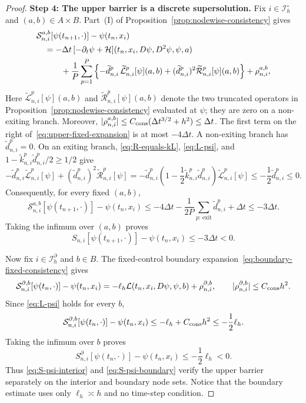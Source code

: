 \documentclass[11pt]{article}
\theoremstyle{definition}
\theoremstyle{remark}
\newcommand{\cS}{\mathcal{S}}
\begin{document}
\begin{proof}
		\medskip
		\noindent\textbf{Step 4: The upper barrier is a discrete supersolution.}
		Fix $i\in\mathcal I_h^\circ$ and $(a,b)\in A\times B$.  Part~\textup{(I)}
		of Proposition~\ref{prop:nodewise-consistency} gives
		\begin{align}
			&\cS_{n,i}^{a,b}[\psi(t_{n+1},\cdot)]-\psi(t_n,x_i)
			\notag\\
			&\quad=-\Delta t\,
			[-\partial_t\psi+\mathcal H](t_n,x_i,D\psi,D^2\psi,\psi,a)
			\notag\\
			&\qquad\quad+\frac1P\sum_{p=1}^P\left\{
			-\widetilde d_{n,i}^p\,
			\widetilde{\mathcal L}_{n,i}^p[\psi](a,b)
			+(\widetilde d_{n,i}^p)^2
			\widetilde{\mathcal R}_{n,i}^p[\psi](a,b)\right\}
			+\rho_{n,i}^{a,b},
			\label{eq:upper-fixed-expansion}
		\end{align}
		Here $\widetilde{\mathcal L}_{n,i}^p[\psi](a,b)$ and
		$\widetilde{\mathcal R}_{n,i}^p[\psi](a,b)$ denote the two truncated
		operators in Proposition~\ref{prop:nodewise-consistency} evaluated at
		$\psi$; they are zero on a non-exiting branch.  Moreover,
		$|\rho_{n,i}^{a,b}|\le C_{\rm cons}(\Delta t^{3/2}+h^2)\le\Delta t$.
		The first term on the right of~\eqref{eq:upper-fixed-expansion} is at most
		$-4\Delta t$.  A non-exiting branch has $\widetilde d_{n,i}^p=0$.
		On an exiting branch, \eqref{eq:R-equals-kL}, \eqref{eq:L-psi}, and
		$1-\widetilde k_{n,i}^p\widetilde d_{n,i}^p/2\ge1/2$ give
		\[
		-\widetilde d_{n,i}^p\widetilde{\mathcal L}_{n,i}^p[\psi]
		+(\widetilde d_{n,i}^p)^2\widetilde{\mathcal R}_{n,i}^p[\psi]
		=-\widetilde d_{n,i}^p
		\left(1-\frac12\widetilde k_{n,i}^p\widetilde d_{n,i}^p\right)
		\widetilde{\mathcal L}_{n,i}^p[\psi]
		\le-\frac12\widetilde d_{n,i}^p\le0.
		\]
		Consequently, for every fixed $(a,b)$,
		\[
		\cS_{n,i}^{a,b}[\psi(t_{n+1},\cdot)]-\psi(t_n,x_i)
		\le-4\Delta t-\frac1{2P}\sum_{p:\,\mathrm{exit}}
		\widetilde d_{n,i}^p+\Delta t
		\le-3\Delta t.
		\]
		Taking the infimum over $(a,b)$ proves
		\begin{equation}
			S_{n,i}[\psi(t_{n+1},\cdot)]-\psi(t_n,x_i)\le-3\Delta t<0.
			\label{eq:S-psi-interior}
		\end{equation}
		
		Now fix $i\in\mathcal I_h^\partial$ and $b\in B$.  The fixed-control
		boundary expansion~\eqref{eq:boundary-fixed-consistency} gives
		\[
		\cS_{n,i}^{\partial,b}[\psi(t_n,\cdot)]-\psi(t_n,x_i)
		=-\ell_h\mathcal L(t_n,x_i,D\psi,\psi,b)
		+\rho_{n,i}^{\partial,b},
		\qquad |\rho_{n,i}^{\partial,b}|\le C_{\rm cons}h^2.
		\]
		Since \eqref{eq:L-psi} holds for every $b$,
		\[
		\cS_{n,i}^{\partial,b}[\psi(t_n,\cdot)]-\psi(t_n,x_i)
		\le-\ell_h+C_{\rm cons}h^2\le-\frac12\ell_h.
		\]
		Taking the infimum over $b$ proves
		\begin{equation}
			S_{n,i}^{\partial}[\psi(t_n,\cdot)]-\psi(t_n,x_i)
			\le-\frac12\ell_h<0.
			\label{eq:S-psi-boundary}
		\end{equation}
		Thus \eqref{eq:S-psi-interior} and \eqref{eq:S-psi-boundary} verify the
		upper barrier separately on the interior and boundary node sets.  Notice
		that the boundary estimate uses only $\ell_h\asymp h$ and no time-step
		condition.
		

\end{proof}
\end{document}
